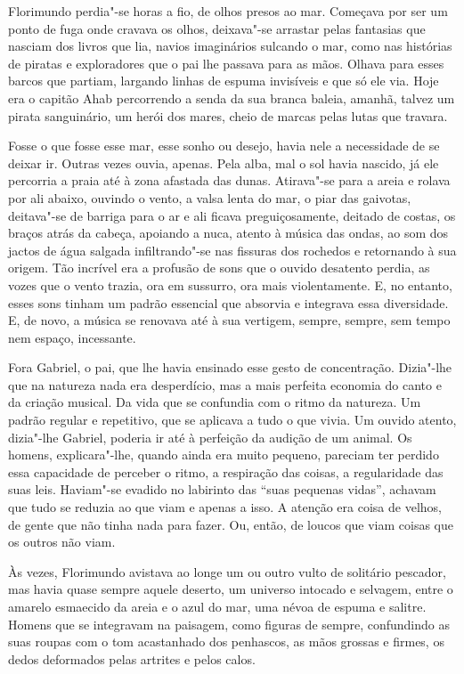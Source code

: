 Florimundo perdia"-se horas a fio, de olhos presos ao mar. Começava por
ser um ponto de fuga onde cravava os olhos, deixava"-se arrastar pelas
fantasias que nasciam dos livros que lia, navios imaginários sulcando o
mar, como nas histórias de piratas e exploradores que o pai lhe passava
para as mãos. Olhava para esses barcos que partiam, largando linhas de
espuma invisíveis e que só ele via. Hoje era o capitão Ahab percorrendo
a senda da sua branca baleia, amanhã, talvez um pirata sanguinário, um
herói dos mares, cheio de marcas pelas lutas que travara.

Fosse o que fosse esse mar, esse sonho ou desejo, havia nele a
necessidade de se deixar ir. Outras vezes ouvia, apenas. Pela alba, mal
o sol havia nascido, já ele percorria a praia até à zona afastada das
dunas. Atirava"-se para a areia e rolava por ali abaixo, ouvindo o vento,
a valsa lenta do mar, o piar das gaivotas, deitava"-se de barriga para o
ar e ali ficava preguiçosamente, deitado de costas, os braços atrás da
cabeça, apoiando a nuca, atento à música das ondas, ao som dos jactos de
água salgada infiltrando"-se nas fissuras dos rochedos e retornando à sua
origem. Tão incrível era a profusão de sons que o ouvido desatento
perdia, as vozes que o vento trazia, ora em sussurro, ora mais
violentamente. E, no entanto, esses sons tinham um padrão essencial que
absorvia e integrava essa diversidade. E, de novo, a música se renovava
até à sua vertigem, sempre, sempre, sem tempo nem espaço, incessante.

Fora Gabriel, o pai, que lhe havia ensinado esse gesto de concentração.
Dizia"-lhe que na natureza nada era desperdício, mas a mais perfeita
economia do canto e da criação musical. Da vida que se confundia com o
ritmo da natureza. Um padrão regular e repetitivo, que se aplicava a
tudo o que vivia. Um ouvido atento, dizia"-lhe Gabriel, poderia ir até à
perfeição da audição de um animal. Os homens, explicara"-lhe, quando
ainda era muito pequeno, pareciam ter perdido essa capacidade de
perceber o ritmo, a respiração das coisas, a regularidade das suas leis.
Haviam"-se evadido no labirinto das ``suas pequenas vidas'', achavam que
tudo se reduzia ao que viam e apenas a isso. A atenção era coisa de
velhos, de gente que não tinha nada para fazer. Ou, então, de loucos que
viam coisas que os outros não viam.

Às vezes, Florimundo avistava ao longe um ou outro vulto de solitário
pescador, mas havia quase sempre aquele deserto, um universo intocado e
selvagem, entre o amarelo esmaecido da areia e o azul do mar, uma névoa
de espuma e salitre. Homens que se integravam na paisagem, como figuras
de sempre, confundindo as suas roupas com o tom acastanhado dos
penhascos, as mãos grossas e firmes, os dedos deformados pelas artrites
e pelos calos.

